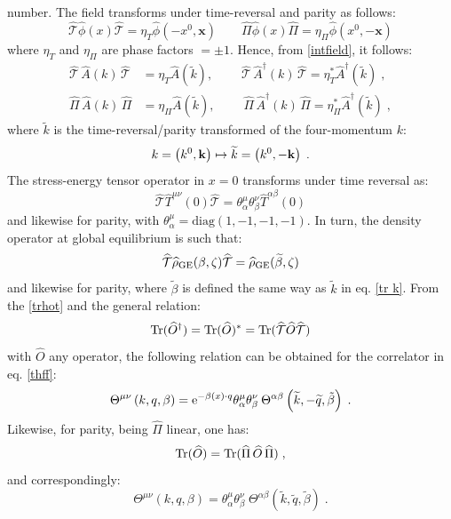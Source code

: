 \documentclass[prd,superscriptaddress,nofootinbib,notitlepage]{revtex4-1}
\def\wT{{\widehat T}}
\def\wrho{{\widehat{\rho}}}
\def\wPi{{\widehat\Pi}}
\def\wO{\widehat O}
\def\wphi{\widehat \phi}
\def\wPi{\widehat \Pi}
\def\wmT{\widehat {\mathcal{T}}}
\def\wPi{\widehat{\Pi}}
\newcommand{\Tr}{{\rm Tr}}
\newcommand{\e}{{\rm e}}
\newcommand{\x}{{\mathbf{x}}}
\begin{document}
number.
The field transforms under time-reversal and parity as follows:
%
$$
  \wmT \wphi(x) \wmT = \eta_T \wphi(-x^0,\x) \qquad \wPi \wphi(x) \wPi = \eta_\Pi \wphi(x^0,-\x)
$$
%
where $\eta_T$ and $\eta_\Pi$ are phase factors $= \pm 1$. Hence, from \eqref{intfield}, it follows:
%
\begin{subequations}
    \begin{align}
        \wmT\,\widehat{A}(k)\,\wmT&=\eta_{T}\widehat{A}(\widetilde{k}),\;\qquad\wmT\,\widehat{A}^\dagger(k)\,\wmT=\eta^*_T\widehat{A}^\dagger(\widetilde{k})\;,\\
        \wPi\,\widehat{A}(k)\,\wPi&=\eta_{\Pi}\widehat{A}(\widetilde{k}),\;\qquad\wPi\,\widehat{A}^\dagger(k)\,\wPi=\eta^*_\Pi\widehat{A}^\dagger(\widetilde{k})\;,
    \end{align}
\end{subequations}
%
where $\widetilde{k}$ is the time-reversal/parity transformed of the four-momentum $k$:
%
\begin{equation}\label{tr k}
    k=\left(k^0,{\bf k}\right)\mapsto\widetilde{k}=\left(k^0,-{\bf k}\right)\;.
\end{equation}
%
The stress-energy tensor operator in $x=0$ transforms under time reversal as:
%
$$
   \wmT \wT^{\mu\nu}(0) \wmT = \theta^{\mu}_\alpha \theta^\nu_\beta \wT^{\alpha\beta}(0) 
$$
%
and likewise for parity, with $\theta^\mu_\alpha=\text{diag}\left(1,-1,-1,-1\right)$. In turn, the density
operator at global equilibrium is such that:
%
\begin{equation}\label{trhot}
    \wmT \wrho_{\rm GE}(\beta,\zeta) \wmT = \wrho_{\rm GE}(\widetilde \beta,\zeta) 
\end{equation}
%
and likewise for parity, where $\widetilde\beta$ is defined the same way as $\widetilde k$ in eq. \eqref{tr k}. 
From the \eqref{trhot} and the general relation:
%
$$
  \Tr (\wO^\dagger) = \Tr (\wO)^* = \Tr (\wmT \wO \wmT) 
$$
%
with $\wO$ any operator, the following relation can be obtained for the correlator in eq. \eqref{thff}:
%
\begin{equation}\label{App1: TR relation per Gamma finale}
    \Theta^{\mu\nu}\left(k,q,\beta\right)=\e^{-\beta(x)\cdot q}\theta^\mu_\alpha\theta^\nu_\beta 
    \:\Theta^{\alpha\beta}\left(\widetilde{k},-\widetilde{q},\tilde{\beta}\right)\;.
\end{equation}
%
Likewise, for parity, being $\wPi$ linear, one has:
%
$$
  \Tr (\wO) = \Tr (\wPi\, \wO\, \wPi)\;, 
$$
%
and correspondingly:
%
\begin{equation}\label{App1: Parity relation per Gamma finale}
\Theta^{\mu\nu}\left(k,q,\beta\right)=\theta^\mu_\alpha\theta^\nu_\beta\;
\Theta^{\alpha\beta}\left(\widetilde{k},\widetilde{q},\widetilde{\beta}\right)\;.
\end{equation}
\end{document}
